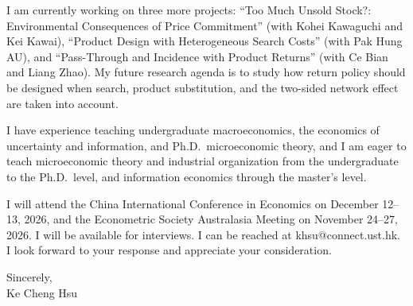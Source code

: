 \documentclass[11pt]{article}
\begin{document}
I am currently working on three more projects: ``Too Much Unsold Stock?: Environmental Consequences of Price Commitment'' (with Kohei Kawaguchi and Kei Kawai), ``Product Design with Heterogeneous Search Costs'' (with Pak Hung AU), and ``Pass-Through and Incidence with Product Returns'' (with Ce Bian and Liang Zhao). My future research agenda is to study how return policy should be designed when search, product substitution, and the two-sided network effect are taken into account.

I have experience teaching undergraduate macroeconomics, the economics of uncertainty and information, and Ph.D.\ microeconomic theory, and I am eager to teach microeconomic theory and industrial organization from the undergraduate to the Ph.D.\ level, and information economics through the master's level.

I will attend the China International Conference in Economics on December 12--13, 2026, and the Econometric Society Australasia Meeting on November 24--27, 2026. I will be available for interviews. I can be reached at khsu@connect.ust.hk. I look forward to your response and appreciate your consideration.

Sincerely,\\[1.4em]
Ke Cheng Hsu
\end{document}

